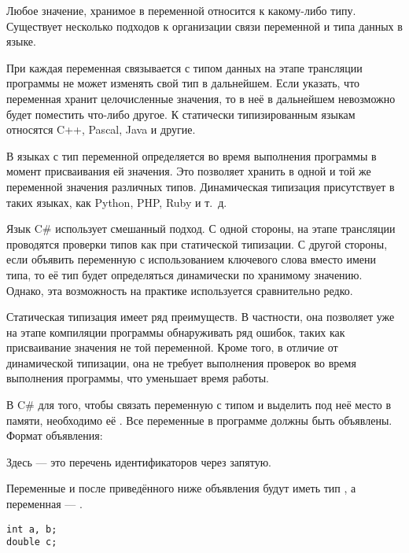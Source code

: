
Любое значение, хранимое в переменной относится к какому-либо типу.
Существует несколько подходов к организации связи переменной и типа
данных в языке.

При  каждая
переменная связывается с типом данных на этапе трансляции программы не
может изменять свой тип в дальнейшем. Если указать, что переменная
хранит целочисленные значения, то в неё в дальнейшем невозможно будет
поместить что-либо другое.  К статически типизированным языкам
относятся C++, Pascal, Java и другие.

В языках с  тип
переменной определяется во время выполнения программы в момент
присваивания ей значения. Это позволяет хранить в одной и той же
переменной значения различных типов.  Динамическая типизация
присутствует в таких языках, как Python, PHP, Ruby и т.~д.

Язык C\# использует смешанный подход. С одной стороны, на этапе
трансляции проводятся проверки типов как при статической типизации. С
другой стороны, если объявить переменную с использованием ключевого
слова  вместо имени типа, то её тип будет определяться
динамически по хранимому значению. Однако, эта возможность на практике
используется сравнительно редко.

Статическая типизация имеет ряд преимуществ. В частности, она
позволяет уже на этапе компиляции программы обнаруживать ряд ошибок,
таких как присваивание значения не той переменной. Кроме того, в
отличие от динамической типизации, она не требует выполнения проверок
во время выполнения программы, что уменьшает время работы.


В C\# для того, чтобы связать переменную с типом и выделить под неё
место в памяти, необходимо её
. Все переменные в программе
должны быть объявлены. Формат объявления:

\begin{center}
  \Lst{ }\Lst{;}
\par\end{center}

Здесь  — это перечень
идентификаторов через запятую.

\begin{example}
  Переменные  и  после приведённого ниже
  объявления будут иметь тип , а переменная  —
  .
\begin{lstlisting}
int a, b;
double c;
\end{lstlisting}
\end{example}

